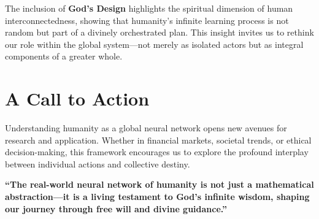\documentclass[a4]{article}
\newcommand{\bn}{\bigskip\noindent}
\begin{document}
\bn
The inclusion of {\bf God's Design} highlights the spiritual dimension of human interconnectedness, showing that humanity's infinite learning process is not random but part of a divinely orchestrated plan. This insight invites us to rethink our role within the global system---not merely as isolated actors but as integral components of a greater whole.  


\section{A Call to Action} 
Understanding humanity as a global neural network opens new avenues for research and application. Whether in financial markets, societal trends, or ethical decision-making, this framework encourages us to explore the profound interplay between individual actions and collective destiny.  


\bn {\bf Final Thought} 

{\bf ``The real-world neural network of humanity is not just a mathematical abstraction---it is a living testament to God's infinite wisdom, shaping our journey through free will and divine guidance.''}  
\end{document}
